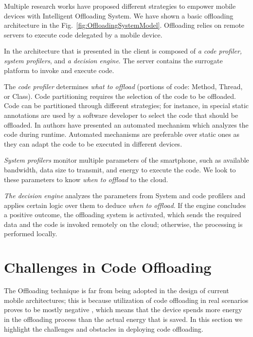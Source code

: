 \documentclass{report}
\begin{document}
Multiple research works have proposed different strategies to empower mobile devices with Intelligent Offloading System.
We have shown a basic offloading architecture in the Fig.~\ref{fig:OffloadingSystemModel}. Offloading relies on remote servers to execute code delegated by a mobile device.

In the architecture that is presented in \cite{flores2015mobile} the client is composed of \textit{a code profiler, system profilers}, and \textit{a decision engine}. The server contains the surrogate platform to invoke and execute code.

The \textit{code profiler} determines \textit{what to offload} (portions of code: Method, Thread, or Class). Code partitioning
requires the selection of the code to be offloaded. Code can be partitioned through different strategies; for instance, in \cite{cuervo2010maui} special static annotations are used by a software developer to select the code that should be offloaded. In \cite{chun2011clonecloud} authors have presented an automated mechanism which analyzes the code during runtime. Automated mechanisms are preferable over static ones as they can adapt the code to be executed in different devices.  

\textit{System profilers} monitor multiple parameters of the smartphone, such as available bandwidth, data size to transmit, and
energy to execute the code. We look to these parameters to know \textit{when to offload} to the cloud. 

\textit{The decision engine} analyzes the parameters from System and code profilers and applies certain logic over them to deduce \textit{when to offload}. If the engine concludes a positive outcome, the offloading system is activated, which sends the required data and the code is invoked remotely on the cloud; otherwise, the processing is performed locally.


\section{Challenges in Code Offloading}

The Offloading technique is far from being adopted in the design of current mobile architectures; this is because utilization of code offloading in real scenarios proves to be mostly negative \cite{flores2013mobile}, which means that the device spends
more energy in the offloading process than the actual energy that is saved. In this section we highlight the challenges and obstacles in deploying code offloading.
\end{document}
